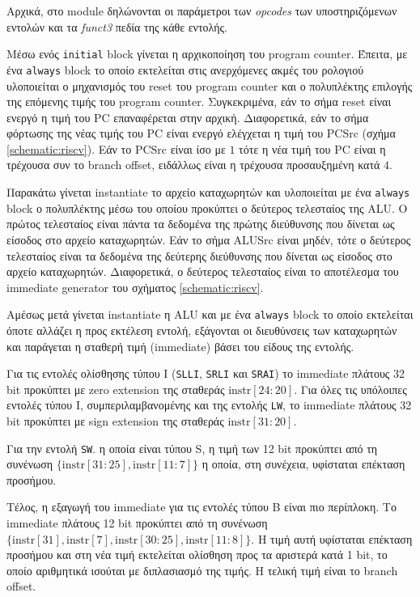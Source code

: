 Αρχικά, στο module δηλώνονται οι παράμετροι των \textsl{opcodes} των υποστηριζόμενων εντολών και τα \textsl{funct3} πεδία της κάθε εντολής.\cite{riscv}\par
Μέσω ενός \texttt{initial} block γίνεται η αρχικοποίηση του program counter. Έπειτα, με ένα \texttt{always} block το οποίο εκτελείται στις ανερχόμενες ακμές του ρολογιού υλοποιείται ο μηχανισμός του reset του program counter και ο πολυπλέκτης επιλογής της επόμενης τιμής του program counter. Συγκεκριμένα, εάν το σήμα reset είναι ενεργό η τιμή του PC επαναφέρεται στην αρχική. Διαφορετικά, εάν το σήμα φόρτωσης της νέας τιμής του PC είναι ενεργό ελέγχεται η τιμή του PCSrc (σχήμα \ref{schematic:riscv}). Εάν το PCSrc είναι ίσο με $1$ τότε η νέα τιμή του PC είναι η τρέχουσα συν το branch offset, ειδάλλως είναι η τρέχουσα προσαυξημένη κατά $4$.\par
Παρακάτω γίνεται instantiate το αρχείο καταχωρητών και υλοποιείται με ένα \texttt{always} block ο πολυπλέκτης μέσω του οποίου προκύπτει ο δεύτερος τελεσταίος της ALU. Ο πρώτος τελεσταίος είναι πάντα τα δεδομένα της πρώτης διεύθυνσης που δίνεται ως είσοδος στο αρχείο καταχωρητών. Εάν το σήμα ALUSrc είναι μηδέν, τότε ο δεύτερος τελεσταίος είναι τα δεδομένα της δεύτερης διεύθυνσης που δίνεται ως είσοδος στο αρχείο καταχωρητών. Διαφορετικά, ο δεύτερος τελεσταίος είναι το αποτέλεσμα του immediate generator του σχήματος \ref{schematic:riscv}.\par
Αμέσως μετά γίνεται instantiate η ALU και με ένα \texttt{always} block το οποίο εκτελείται όποτε αλλάζει η προς εκτέλεση εντολή, εξάγονται οι διευθύνσεις των καταχωρητών και παράγεται η σταθερή τιμή (immediate) βάσει του είδους της εντολής.\par
Για τις εντολές ολίσθησης τύπου I (\texttt{SLLI}, \texttt{SRLI} και \texttt{SRAI}) το immediate πλάτους 32 bit προκύπτει με zero extension της σταθεράς $\text{instr}[24:20]$. Για όλες τις υπόλοιπες εντολές τύπου I, συμπεριλαμβανομένης και της εντολής \texttt{LW}, το immediate πλάτους 32 bit προκύπτει με sign extension της σταθεράς $\text{instr}[31:20]$.\par
Για την εντολή \texttt{SW}. η οποία είναι τύπου S\cite{riscv}, η τιμή των 12 bit προκύπτει από τη συνένωση $\{\text{instr}[31:25],\text{instr}[11:7]\}$ η οποία, στη συνέχεια, υφίσταται επέκταση προσήμου.\par
Τέλος, η εξαγωγή του immediate για τις εντολές τύπου B είναι πιο περίπλοκη. Το immediate πλάτους 12 bit προκύπτει από τη συνένωση $\{\text{instr}[31],\text{instr}[7],\text{instr}[30:25],\text{instr}[11:8]\}$. Η τιμή αυτή υφίσταται επέκταση προσήμου και στη νέα τιμή εκτελείται ολίσθηση προς τα αριστερά κατά 1 bit, το οποίο αριθμητικά ισούται με διπλασιασμό της τιμής. Η τελική τιμή είναι το branch offset.\par
